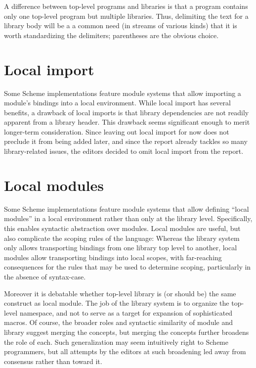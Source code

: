 \documentclass[twoside,twocolumn]{algol60}
\begin{document}
A difference between top-level programs and libraries is that a
program contains only one top-level program but multiple libraries.
Thus, delimiting the text for a library body will be a
a common need (in streams of various kinds) that it is worth
standardizing the delimiters; parentheses are the obvious choice.

\section{Local import}

Some Scheme implementations feature module systems that allow
importing a module's bindings into a local environment.  While local
import has several benefits, a drawback of local
imports is that library dependencies are not readily apparent from a
library header. This drawback seems significant enough to merit
longer-term consideration. Since leaving out local import for now does
not preclude it from being added later, and since the report already
tackles so many library-related issues, the editors decided to omit
local import from the report.

\section{Local modules}

Some Scheme implementations feature module systems that allow defining
``local modules'' in a local environment rather than only at the
library level.  Specifically, this enables syntactic abstraction over
modules.  Local modules are useful, but also complicate
the scoping rules of the language: Whereas the library system only
allows transporting bindings from one library top level to another,
local modules allow transporting bindings into local scopes, with
far-reaching consequences for the rules that may be used to determine
scoping, particularly in the absence of {\cf syntax-case}.

Moreover it is debatable whether top-level {\cf library} is (or should
be) the same construct as local {\cf module}. The job of the library
system is to organize the top-level namespace, and not to serve as a
target for expansion of sophisticated macros. Of course, the broader
roles and syntactic similarity of {\cf module} and {\cf library}
suggest merging the concepts, but merging the concepts further
broadens the role of each.  Such generalization may seem intuitively
right to Scheme programmers, but all attempts by the editors at such
broadening led away from consensus rather than toward it.
\end{document}

